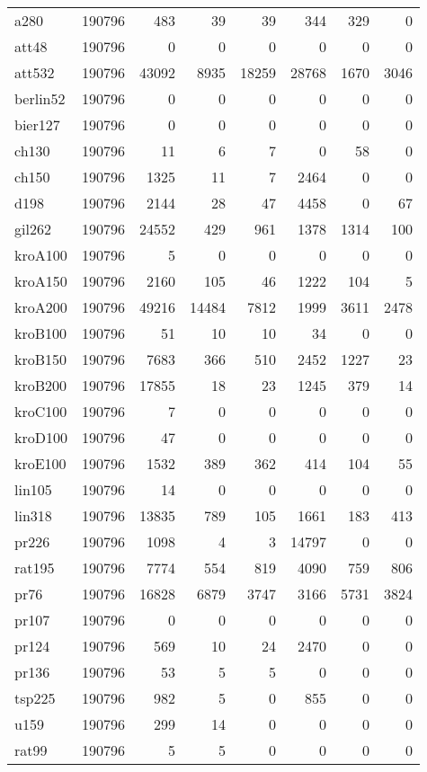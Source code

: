\begin{center}
\begin{longtable}{llrrrrrr}
a280 & 190796 & 483 & 39 & 39 & 344 & 329 & 0\\
att48  & 190796 & 0 & 0 & 0 & 0 & 0 & 0\\
att532  & 190796 & 43092 & 8935 & 18259 & 28768 & 1670 & 3046\\
berlin52  & 190796 & 0 & 0 & 0 & 0 & 0 & 0\\
bier127  & 190796 & 0 & 0 & 0 & 0 & 0 & 0\\
ch130  & 190796 & 11 & 6 & 7 & 0 & 58 & 0\\
ch150  & 190796 & 1325 & 11 & 7 & 2464 & 0 & 0\\
d198  & 190796 & 2144 & 28 & 47 & 4458 & 0 & 67\\
gil262  & 190796 & 24552 & 429 & 961 & 1378 & 1314 & 100\\
kroA100  & 190796 & 5 & 0 & 0 & 0 & 0 & 0\\
kroA150  & 190796 & 2160 & 105 & 46 & 1222 & 104 & 5\\
kroA200  & 190796 & 49216 & 14484 & 7812 & 1999 & 3611 & 2478\\
kroB100  & 190796 & 51 & 10 & 10 & 34 & 0 & 0\\
kroB150  & 190796 & 7683 & 366 & 510 & 2452 & 1227 & 23\\
kroB200  & 190796 & 17855 & 18 & 23 & 1245 & 379 & 14\\
kroC100  & 190796 & 7 & 0 & 0 & 0 & 0 & 0\\
kroD100  & 190796 & 47 & 0 & 0 & 0 & 0 & 0\\
kroE100  & 190796 & 1532 & 389 & 362 & 414 & 104 & 55\\
lin105  & 190796 & 14 & 0 & 0 & 0 & 0 & 0\\
lin318  & 190796 & 13835 & 789 & 105 & 1661 & 183 & 413\\
pr226  & 190796 & 1098 & 4 & 3 & 14797 & 0 & 0\\
rat195  & 190796 & 7774 & 554 & 819 & 4090 & 759 & 806\\
pr76  & 190796 & 16828 & 6879 & 3747 & 3166 & 5731 & 3824\\
pr107  & 190796 & 0 & 0 & 0 & 0 & 0 & 0\\
pr124  & 190796 & 569 & 10 & 24 & 2470 & 0 & 0\\
pr136  & 190796 & 53 & 5 & 5 & 0 & 0 & 0\\
tsp225  & 190796 & 982 & 5 & 0 & 855 & 0 & 0\\
u159  & 190796 & 299 & 14 & 0 & 0 & 0 & 0\\
rat99  & 190796 & 5 & 5 & 0 & 0 & 0 & 0\\

\end{longtable}
\end{center}
